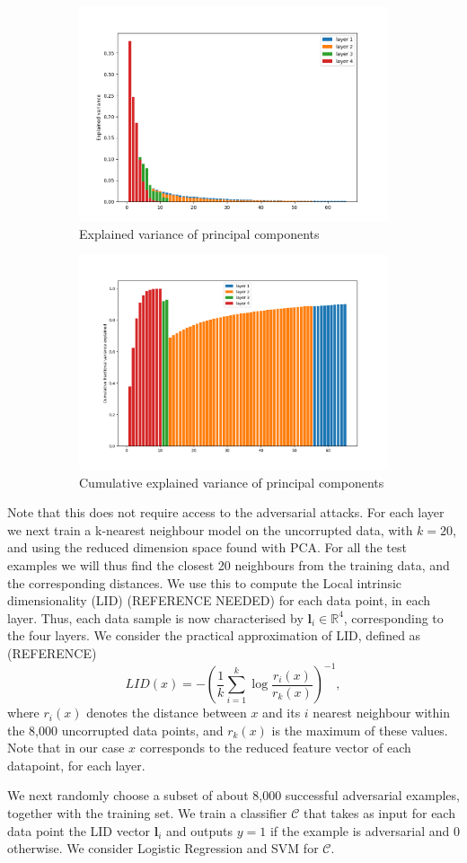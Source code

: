 \begin{figure}
\centering
\begin{subfigure}{.5\textwidth}
  \centering
  \includegraphics[width=.6\linewidth]{ExplainedVarianceLegend.png}
  \caption{Explained variance of principal components}
  \label{fig:PCA1}
\end{subfigure}%
\begin{subfigure}{.5\textwidth}
  \centering
  \includegraphics[width=.4\linewidth]{CumExplainedVarianceLegend.png}
  \caption{Cumulative explained variance of principal components}
  \label{fig:PCA2}
\end{subfigure}
\caption{}
\label{fig:PCA}
\end{figure}
Note that this does not require access to the adversarial attacks. For each layer we next train a k-nearest neighbour model on the uncorrupted data, with $k=20$, and using the reduced dimension space found with PCA. For all the test examples we will thus find the closest 20 neighbours from the training data, and the corresponding distances.  We use this to compute the Local intrinsic dimensionality (LID) (REFERENCE NEEDED) for each data point, in each layer. Thus, each data sample is now characterised by $\mathbf{l}_i \in \mathbb{R}^4$, corresponding to the four layers. We consider the practical approximation of LID, defined as (REFERENCE)
\begin{equation}
LID(x) = -\left(\frac{1}{k}\sum_{i=1}^{k}\log\frac{r_i(x)}{r_k(x)}\right)^{-1},
\end{equation}
where $r_i(x)$ denotes the distance between $x$ and its $i$ nearest neighbour within the 8,000 uncorrupted data points, and $r_k(x)$ is the maximum of these values. Note that in our case $x$ corresponds to the reduced feature vector of each datapoint, for each layer.

We next randomly choose a subset of about 8,000 successful adversarial examples, together with the training set. We train a classifier $\mathcal{C}$ that takes as input for each data point the LID vector $\mathbf{l}_i$ and outputs $y=1$ if the example is adversarial and $0$ otherwise. We consider Logistic Regression and SVM for $\mathcal{C}$.